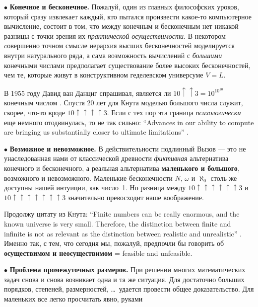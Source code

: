 \documentclass[intlimits,twoside,a4paper,11pt]{article}
\begin{document}
		\par\smallskip
		$\bullet$  {\bf Конечное и бесконечное.} 
		Пожалуй, один из главных философских уроков, который сразу извлекает каждый, 
		кто пытался произвести какое-то компьютерное вычисление, состоит в том, что 
		между конечным и бесконечным нет никакой разницы с точки зрения их
		{\it практической осуществимости\/}. В некотором cовершенно точном смысле 
		иерархия высших бесконечностей моделируется внутри натурального ряда, а
		сама возможность вычислений с {\it большими\/} конечными числами 
		предполагает существование более высоких бесконечностей, чем те, которые 
		живут в конструктивном геделевском универсуме $V=L$.
		\par
		В 1955 году Давид ван Данциг спрашивал, является ли  
		$10\uparrow\uparrow 3=10^{\displaystyle10^{10}}$ конечным числом \cite{D}.
		Спустя 20 лет для Кнута \cite{K76} моделью большого числа служит, скорее, 
		что-то вроде $10\uparrow\uparrow\uparrow\uparrow 3$. Если с тех пор эта граница
		{\it психологически\/} еще немного отодвинулась, то не так сильно: ``Advances 
		in our ability to compute are bringing us substantially closer to ultimate limitations''
		\cite{K76}.
		\par\smallskip
		$\bullet$ {\bf Возможное и невозможное.} В действительности подлинный
		Вызов --- это не унаследованная нами от классической древности
		{\it фиктивная\/} альтернатива конечного и бесконечного, а реальная альтернатива
		{\bf маленького и большого\/}, возможного и невозможного. Маленькие
		бесконечности $N$, $\omega$ и $\aleph_0$ столь же доступны нашей интуиции,
		как число~1. Но разница между
		$10\uparrow\uparrow\uparrow\uparrow\uparrow\uparrow 3$ и
		$10\uparrow\uparrow\uparrow\uparrow\uparrow\uparrow\uparrow 3$
		значительно превосходит наше воображение.
		\par
		Продолжу цитату из Кнута:
		``Finite numbers can be really enormous, and the known universe is very small.
		Therefore, the distinction between finite and infinite is not as relevant as the
		distinction between realistic and unrealistic'' \cite{K76}. Именно так, с тем,
		что сегодня мы,
		пожалуй, предпочли бы говорить об {\bf осуществимом и неосуществимом}
		= feasible and unfeasible.
		\par\smallskip
		$\bullet$ {\bf Проблема промежуточных размеров.} При решении многих 
		математических задач снова и снова возникает одна и та же ситуация. Для достаточно больших порядков, степеней, размерностей, \ldots \ удается провести
		общее доказательство. Для маленьких все легко просчитать явно, руками 
\end{document}
